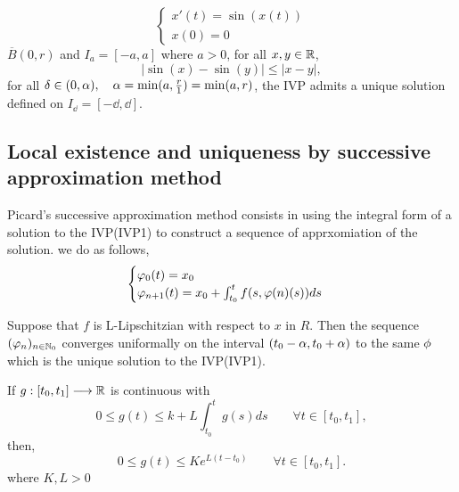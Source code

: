 \begin{example}
\[
  \begin{cases}
x'(t)  = \sin (x(t) )    \\
x(0)  = 0
  \end{cases}
\]
$\overline{B}(0, r)$ and $I_{a} = \left[ -a, a \right] $  where $a > 0$, for all $x,y \in   \mathbb{R}  $,
\[
\left| \sin (x) - \sin (y)      \right|   \leq 
\left| x-y \right|,
\]
for all $\delta  \in   (0, \alpha), \quad \alpha = \min (a, \frac{r}{1}) = \min (a, r)  $, the IVP 
admits a unique solution defined on $I_{\dd } = \left[ -\dd , \dd  \right] $.
\end{example}
\subsection{Local existence and uniqueness by successive approximation method}
Picard's successive approximation method consists in using the integral form of a solution to the IVP(IVP1)
to construct a sequence of apprxomiation of the solution. we do as follows,
\[
\begin{cases}
\varphi_{0}(t)  = x_0\\
\varphi _{n+1}(t)  = x_0 + 
\int_{t_0}^{t} f(s, \varphi (n) (s) ) ds
\end{cases}
\]
\begin{theorem}[]
Suppose that $f $ is L-Lipschitzian with respect
to $x $ in 
$R $. Then the sequence $(\varphi _{n}) _{n \in   \mathbb{N}_0} $
converges uniformally on the interval $(t_0 - \alpha, t_0 + \alpha)  $ 
to the same $\phi  $ which is the unique solution to the IVP(IVP1).
\end{theorem}
\begin{corollary}
  If $ g : [t_0, t_1]  \longrightarrow \mathbb{R} $ is continuous with 
  \[
  0 \leq  g(t)  \leq  k + L 
  \int_{t_0}^{t} g(s) ds \quad \quad \forall t \in  [t_0, t_1],
  \]
  then, 
  \[
  0 \leq g(t)  \leq K e^{L(t-t_0) } \quad \quad 
  \forall t \in   \left[ t_0, t_1 \right].
  \]
  where $K, L > 0 $ 
\end{corollary}
